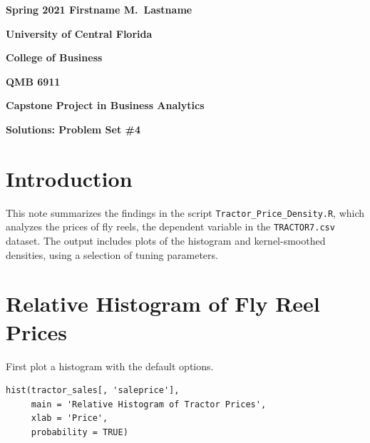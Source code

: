 \documentclass[11pt]{book}
\begin{document}

\pagestyle{empty}
{\noindent\bf Spring 2021 \hfill Firstname M.~Lastname}
\vskip 16pt
\centerline{\bf University of Central Florida}
\centerline{\bf College of Business}
\vskip 16pt
\centerline{\bf QMB 6911}
\centerline{\bf Capstone Project in Business Analytics}
\vskip 10pt
\centerline{\bf Solutions:  Problem Set \#4}
\vskip 32pt
\noindent

\section{Introduction}

This note summarizes the findings in the script
\texttt{Tractor\_Price\_Density.R},
which analyzes the prices of fly reels,
the dependent variable in the \texttt{TRACTOR7.csv} dataset.
The output includes plots of the histogram
and kernel-smoothed densities,
using a selection of tuning parameters.

\vfill
\pagebreak
\section{Relative Histogram of Fly Reel Prices}


First plot a histogram with the default options.

\begin{verbatim}
hist(tractor_sales[, 'saleprice'],
     main = 'Relative Histogram of Tractor Prices',
     xlab = 'Price',
     probability = TRUE)
\end{verbatim}
\end{document}

